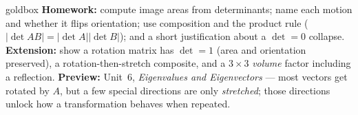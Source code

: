 \documentclass[10pt]{article}
\begin{document}
\begin{skillbox}{goldbox}
\textbf{Homework:} compute image areas from determinants; name each motion and whether it flips
orientation; use composition and the product rule ($|\det AB|=|\det A||\det B|$); and a short
justification about a $\det=0$ collapse. \textbf{Extension:} show a rotation matrix has $\det=1$ (area
and orientation preserved), a rotation-then-stretch composite, and a $3\times3$ \emph{volume} factor
including a reflection. \textbf{Preview:} Unit~6, \emph{Eigenvalues and Eigenvectors} --- most vectors
get rotated by $A$, but a few special directions are only \emph{stretched}; those directions unlock how
a transformation behaves when repeated.
\end{skillbox}
\end{document}
